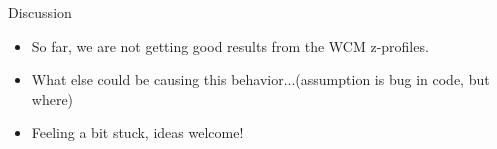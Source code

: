\begin{frame}{Discussion}
	\begin{itemize}
		\item So far, we are not getting good results from the WCM z-profiles.
		\item What else could be causing this behavior...(assumption is bug in code,
			but where)
		\item Feeling a bit stuck, ideas welcome!
	\end{itemize}
\end{frame}
